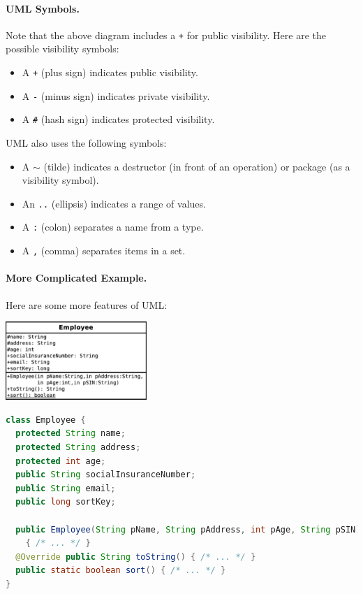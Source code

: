 \paragraph{UML Symbols.} Note that the above diagram includes a {\tt +}
for public visibility. Here are the possible visibility symbols:
\begin{itemize}
\item A {\tt +} (plus sign) indicates public visibility.
\item A {\tt -} (minus sign) indicates private visibility.
\item A {\tt \#} (hash sign) indicates protected visibility.
\end{itemize}

UML also uses the following symbols:
\begin{itemize}
\item A {\tt $\sim$} (tilde) indicates a destructor (in front of an operation) 
or package (as a visibility symbol).
\item An {\tt ..} (ellipsis) indicates a range of values.
\item A {\tt :} (colon) separates a name from a type.
\item A {\tt ,} (comma) separates items in a set.
\end{itemize}

\paragraph{More Complicated Example.} Here are some more features of UML:

\begin{center}
\includegraphics[height=8em]{images/Employee.pdf}
\end{center}

\begin{lstlisting}[language={Java},basicstyle=\small]
class Employee {
  protected String name;
  protected String address;
  protected int age;
  public String socialInsuranceNumber;
  public String email;
  public long sortKey;

  public Employee(String pName, String pAddress, int pAge, String pSIN) 
    { /* ... */ }
  @Override public String toString() { /* ... */ }
  public static boolean sort() { /* ... */ }
}
\end{lstlisting}

